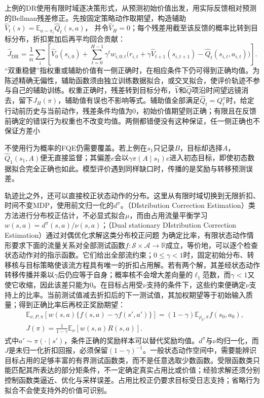 上例的DR使用有限时域逐决策形式，从预测初始价值出发，用实际反馈相对预测的Bellman残差修正。先按固定策略动作取期望，构造辅助
$\widehat V_t(s)=\mathbb E_{a\sim\pi_t}\widehat Q_t(s,a)$，
并令$\widehat V_H=0$；每个残差用截至该反馈的概率比转到目标分布，折扣累加后再平均回合贡献：
\begin{equation}
  \label{eq:rl-information-dr}
  \widehat J_{\mathrm{DR}}
  =\frac1n\sum_i\left[
    \widehat V_0(s_{i,0})
    +\sum_{t=0}^{H-1}\gamma^t w_{i,0:t}
       \bigl(r_{i,t}+\gamma\widehat V_{t+1}(s_{i,t+1})
                         -\widehat Q_t(s_{i,t},a_{i,t})\bigr)
    \right].
\end{equation}
“双重稳健”指权重或辅助价值有一侧正确时，在相应条件下仍可得到正确均值。为陈述精确无偏性，辅助函数须由独立训练数据拟合，或交叉拟合，使评价轨迹不参与自己的辅助训练。权重正确时，残差转到目标分布，$\widehat V$和$\widehat Q$项沿时间望远镜消去，留下$J_H(\pi)$，辅助值有误也不影响等式。辅助值全部满足$\widehat Q_t=Q_t^\pi$时，给定行动前历史与当前动作，残差条件均值为0，初始价值期望则正确；有限且在反馈前确定的错误行为权重也不改变均值。两侧都错便没有这种保证，任一侧正确也不保证方差小

不使用行为概率的FQE仍需要覆盖。若上例在$s_1$只记录$B$，目标却选择$A$，$\widehat Q_1(s_1,A)$便无直接监督；其偏差$e$会以$\gamma\pi(A\mid s_1)e$进入初态目标，即使初态数据拟合完全正确也如此。模型评价遇到同样缺口时，传播的是奖励与转移预测误差。

轨迹比之外，还可以直接校正状态动作的分布。这里从有限时域切换到无限折扣、时间不变MDP，使用前文归一化的$d^\pi$。（DIstribution Correction Estimation）类方法进行分布校正估计，不必显式拟合$\mu$，而由占用流量平衡学习
$w(s,a)=d^\pi(s,a)/\nu(s,a)$；（Dual stationary DIstribution Correction Estimation）通过对偶优化求解这类分布校正问题
为确定比率，有限状态动作情形要求下面的流量关系对全部测试函数$f:\mathcal S\times\mathcal A\to\mathbb R$成立，等价地，可以逐个检查状态动作对的指示函数。它们给出全部流约束；$0\leq\gamma<1$时，固定初始分布、转移核与目标策略使该流方程具有唯一的折扣占用解。若有两个解，其差经状态动作转移传播并乘以$\gamma$后仍应等于自身；概率核不会增大差向量的$\ell_1$范数，而$\gamma<1$又使它收缩，因此该差只能为0。在目标占用受$\nu$支持的条件下，这些约束便确定$\nu$支持上的比率。当前测试值减去折扣后的下一测试值，其加权期望等于初始输入质量；得到正确比率后再校正奖励期望：
\begin{align}
  \label{eq:rl-information-dice}
  &\mathbb E_{\nu,P,\pi}\!
       \left[w(s,a)\{f(s,a)-\gamma f(s',a')\}\right]
       =(1-\gamma)\mathbb E_{\rho_0,\pi}f(s_0,a_0),\nonumber\\
  &J(\pi)=\frac{1}{1-\gamma}\mathbb E_\nu[w(s,a)R(s,a)].
\end{align}
式中$a'\sim\pi(\cdot\mid s')$，条件正确的奖励样本可以替代奖励均值。$d^\pi$与$\nu$均归一化，而$J$是未归一化折扣回报，必须保留$(1-\gamma)^{-1}$。一般状态动作空间中，需要能辨识目标占用的足够丰富的有界测试函数类，而不是任意选取少数函数。受限函数类只能匹配其所表达的部分矩条件，不一定确定真实占用比或价值；经验求解还须分别控制函数类逼近、优化与采样误差。占用比校正仍要求目标受日志支持；省略行为拟合不会使支持外的价值可识别。

